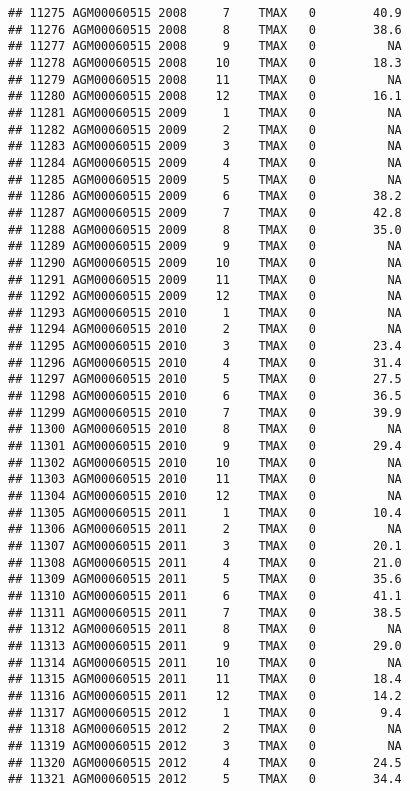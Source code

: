 \documentclass{article}\usepackage[]{graphicx}\usepackage[]{color}
\makeatletter
\newenvironment{kframe}{%
 \def\at@end@of@kframe{}%
 \ifinner\ifhmode%
  \def\at@end@of@kframe{\end{minipage}}%
  \begin{minipage}{\columnwidth}%
 \fi\fi%
 \def\FrameCommand##1{\hskip\@totalleftmargin \hskip-\fboxsep
 \colorbox{shadecolor}{##1}\hskip-\fboxsep
     \hskip-\linewidth \hskip-\@totalleftmargin \hskip\columnwidth}%
 \MakeFramed {\advance\hsize-\width
   \@totalleftmargin\z@ \linewidth\hsize
   \@setminipage}}%
 {\par\unskip\endMakeFramed%
 \at@end@of@kframe}
\newenvironment{knitrout}{}{} %
\makeatother
\begin{document}
\begin{knitrout}
\begin{kframe}
\begin{verbatim}
## 11275 AGM00060515 2008     7    TMAX   0        40.9
## 11276 AGM00060515 2008     8    TMAX   0        38.6
## 11277 AGM00060515 2008     9    TMAX   0          NA
## 11278 AGM00060515 2008    10    TMAX   0        18.3
## 11279 AGM00060515 2008    11    TMAX   0          NA
## 11280 AGM00060515 2008    12    TMAX   0        16.1
## 11281 AGM00060515 2009     1    TMAX   0          NA
## 11282 AGM00060515 2009     2    TMAX   0          NA
## 11283 AGM00060515 2009     3    TMAX   0          NA
## 11284 AGM00060515 2009     4    TMAX   0          NA
## 11285 AGM00060515 2009     5    TMAX   0          NA
## 11286 AGM00060515 2009     6    TMAX   0        38.2
## 11287 AGM00060515 2009     7    TMAX   0        42.8
## 11288 AGM00060515 2009     8    TMAX   0        35.0
## 11289 AGM00060515 2009     9    TMAX   0          NA
## 11290 AGM00060515 2009    10    TMAX   0          NA
## 11291 AGM00060515 2009    11    TMAX   0          NA
## 11292 AGM00060515 2009    12    TMAX   0          NA
## 11293 AGM00060515 2010     1    TMAX   0          NA
## 11294 AGM00060515 2010     2    TMAX   0          NA
## 11295 AGM00060515 2010     3    TMAX   0        23.4
## 11296 AGM00060515 2010     4    TMAX   0        31.4
## 11297 AGM00060515 2010     5    TMAX   0        27.5
## 11298 AGM00060515 2010     6    TMAX   0        36.5
## 11299 AGM00060515 2010     7    TMAX   0        39.9
## 11300 AGM00060515 2010     8    TMAX   0          NA
## 11301 AGM00060515 2010     9    TMAX   0        29.4
## 11302 AGM00060515 2010    10    TMAX   0          NA
## 11303 AGM00060515 2010    11    TMAX   0          NA
## 11304 AGM00060515 2010    12    TMAX   0          NA
## 11305 AGM00060515 2011     1    TMAX   0        10.4
## 11306 AGM00060515 2011     2    TMAX   0          NA
## 11307 AGM00060515 2011     3    TMAX   0        20.1
## 11308 AGM00060515 2011     4    TMAX   0        21.0
## 11309 AGM00060515 2011     5    TMAX   0        35.6
## 11310 AGM00060515 2011     6    TMAX   0        41.1
## 11311 AGM00060515 2011     7    TMAX   0        38.5
## 11312 AGM00060515 2011     8    TMAX   0          NA
## 11313 AGM00060515 2011     9    TMAX   0        29.0
## 11314 AGM00060515 2011    10    TMAX   0          NA
## 11315 AGM00060515 2011    11    TMAX   0        18.4
## 11316 AGM00060515 2011    12    TMAX   0        14.2
## 11317 AGM00060515 2012     1    TMAX   0         9.4
## 11318 AGM00060515 2012     2    TMAX   0          NA
## 11319 AGM00060515 2012     3    TMAX   0          NA
## 11320 AGM00060515 2012     4    TMAX   0        24.5
## 11321 AGM00060515 2012     5    TMAX   0        34.4

\end{verbatim}
\end{kframe}
\end{knitrout}
\end{document}
